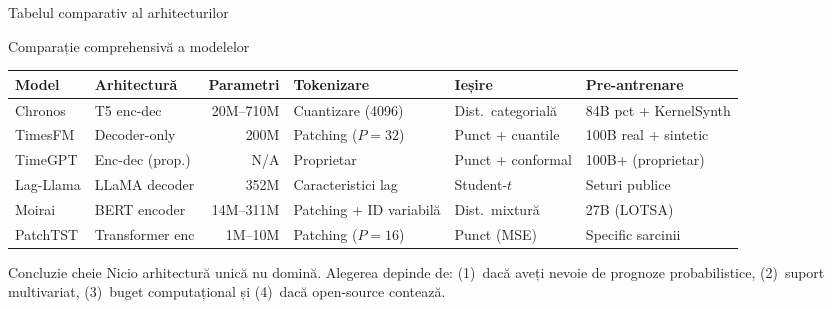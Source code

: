 \documentclass[9pt, aspectratio=169, t]{beamer}
\begin{document}
\begin{frame}{Tabelul comparativ al arhitecturilor}
    \begin{cminipage}{0.95\textwidth}
    \vspace{-3mm}
    {\scriptsize
    \begin{block}{Comparație comprehensivă a modelelor}
    \vspace{-2mm}
    \begin{center}
    \begin{tabular}{l|l|r|l|l|l}
        \toprule
        \textbf{Model} & \textbf{Arhitectură} & \textbf{Parametri} & \textbf{Tokenizare} & \textbf{Ieșire} & \textbf{Pre-antrenare} \\
        \midrule
        Chronos & T5 enc-dec & 20M--710M & Cuantizare (4096) & Dist.\ categorială & 84B pct + KernelSynth \\
        TimesFM & Decoder-only & 200M & Patching ($P\!=\!32$) & Punct + cuantile & 100B real + sintetic \\
        TimeGPT & Enc-dec (prop.) & N/A & Proprietar & Punct + conformal & 100B+ (proprietar) \\
        Lag-Llama & LLaMA decoder & 352M & Caracteristici lag & Student-$t$ & Seturi publice \\
        Moirai & BERT encoder & 14M--311M & Patching + ID variabilă & Dist.\ mixtură & 27B (LOTSA) \\
        PatchTST & Transformer enc & 1M--10M & Patching ($P\!=\!16$) & Punct (MSE) & Specific sarcinii \\
        \bottomrule
    \end{tabular}
    \end{center}
    \vspace{-2mm}
    \end{block}
    }
    \vspace{-2mm}
    \begin{exampleblock}{Concluzie cheie}
        {\small Nicio arhitectură unică nu domină. Alegerea depinde de: (1)~dacă aveți nevoie de prognoze probabilistice, (2)~suport multivariat, (3)~buget computațional și (4)~dacă open-source contează.}
    \end{exampleblock}
    \end{cminipage}
\end{frame}
\end{document}
